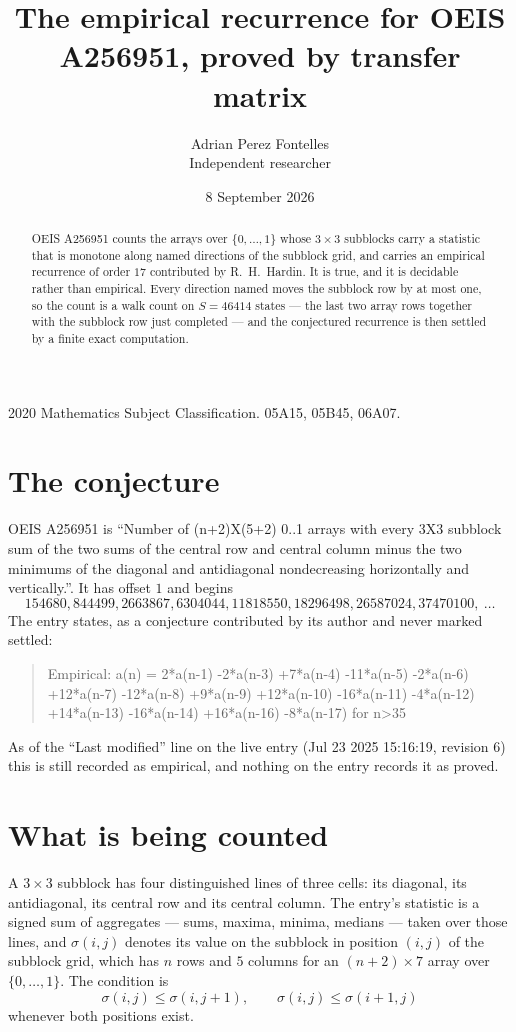 \documentclass[11pt,a4paper]{article}
\title{The empirical recurrence for OEIS A256951, proved by transfer matrix}
\author{Adrian Perez Fontelles\\ \small Independent researcher}
\date{8 September 2026}
\theoremstyle{plain}
\theoremstyle{definition}
\begin{document}
\maketitle

\begin{abstract}
OEIS A256951 counts the arrays over $\{0,\dots,1\}$ whose $3\times3$ subblocks carry a
statistic that is monotone along named directions of the subblock grid, and carries an
empirical recurrence of order $17$ contributed by R.~H.~Hardin. It is true, and it is
decidable rather than empirical. Every direction named moves the subblock row by at most one,
so the count is a walk count on $S=46414$ states --- the last two array rows together with the
subblock row just completed --- and the conjectured recurrence is then settled by a finite
exact computation.
\end{abstract}

\noindent\small 2020 Mathematics Subject Classification. 05A15, 05B45, 06A07.\normalsize

\section{The conjecture}

OEIS A256951 is ``Number of (n+2)X(5+2) 0..1 arrays with every 3X3 subblock sum of the two sums of the central row and central column minus the two minimums of the diagonal and antidiagonal nondecreasing horizontally and vertically.''. It has offset $1$ and begins
\[
154680, 844499, 2663867, 6304044, 11818550, 18296498, 26587024, 37470100,\ \dots
\]
The entry states, as a conjecture contributed by its author and never marked settled:
\begin{quote}
Empirical: a(n) = 2*a(n-1) -2*a(n-3) +7*a(n-4) -11*a(n-5) -2*a(n-6) +12*a(n-7) -12*a(n-8) +9*a(n-9) +12*a(n-10) -16*a(n-11) -4*a(n-12) +14*a(n-13) -16*a(n-14) +16*a(n-16) -8*a(n-17) for n>35
\end{quote}
As of the ``Last modified'' line on the live entry (Jul 23 2025 15:16:19, revision 6) this is still
recorded as empirical, and nothing on the entry records it as proved.

\section{What is being counted}

A $3\times3$ subblock has four distinguished lines of three cells: its diagonal, its
antidiagonal, its central row and its central column. The entry's statistic is a signed sum of
aggregates --- sums, maxima, minima, medians --- taken over those lines, and $\sigma(i,j)$
denotes its value on the subblock in position $(i,j)$ of the subblock grid, which has $n$ rows
and $5$ columns for an $(n+2)\times7$ array over $\{0,\dots,1\}$. The condition is
\[
\sigma(i,j)\le\sigma(i,j+1),\qquad \sigma(i,j)\le\sigma(i+1,j)
\]
whenever both positions exist.
\end{document}
